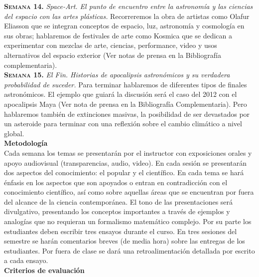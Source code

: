 \documentclass[letterpaper,10pt,onecolumn]{article}
\begin{document}
\noindent\textbf{\textsc{Semana 14.}} \textit{Space-Art. El punto de encuentro
entre la astronom\'ia y las ciencias del espacio con las artes
pl\'asticas.} Recorreremos la obra de artistas como Olafur Eliasson que se
integran conceptos de espacio, luz, astronom\'ia y cosmolog\'ia en sus
obras; hablaremos de festivales de arte como Kosmica que se dedican
a experimentar con mezclas de arte, ciencias, performance, video y
usos alternativos del espacio exterior (Ver notas de prensa en la
Bibliograf\'ia complementaria).  
\\[-0.3cm]  

\noindent\textbf{\textsc{Semana 15.}} \textit{El Fin. Historias de apocalipsis
astron\'omicos y su verdadera probabilidad de suceder.} Para terminar
hablaremos de diferentes tipos de finales astron\'omicos. El ejemplo
que guiar\'a la discusi\'on ser\'a el caso del 2012 con el apocalipsis
Maya (Ver nota de prensa en la Bibliograf\'ia Complementaria). Pero
hablaremos tambi\'en de extinciones masivas, la posibilidad de ser
devastados por un asteroide para terminar con una reflexi\'on sobre el
cambio clim\'atico a nivel global.\\[0.1cm] 

\noindent\textbf{\large {} \quad Metodolog\'ia}\\[-0.2cm]


\noindent\normalsize 
Cada semana los temas se presentar\'an por el instructor con
exposiciones orales y apoyo audiovisual (transparencias, audio,
video). En cada sesi\'on se presentar\'an dos aspectos del
conocimiento: el popular y el cient\'ifico. En cada tema se har\'a
\'enfasis en los aspectos que son apoyados o entran en contradicci\'on con el conocimiento cient\'ifico, as\'i como sobre
aquellas \'areas que se encuentran por fuera del alcance de la ciencia
contempor\'anea. El tono de las presentaciones ser\'a divulgativo,
presentando los conceptos importantes a trav\'es
de ejemplos y analog\'ias que no requieran un formalismo matem\'atico
complejo. Por su parte los estudiantes deben escribir tres ensayos
durante el curso. En tres sesiones del semestre se har\'an comentarios breves
(de media hora) sobre las entregas de los estudiantes. Por fuera de
clase se dar\'a una retroalimentaci\'on detallada por escrito a cada  ensayo.  
\\[0.1cm]

\noindent\textbf{\large {} \quad Criterios de evaluaci\'on}\\[-0.2cm]
\end{document}

